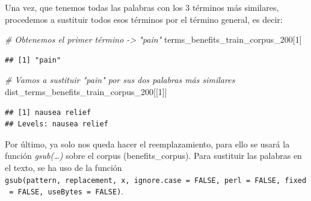 \documentclass[spanish,]{article}
\newenvironment{Shaded}{\begin{snugshade}}{\end{snugshade}}
\newcommand{\DecValTok}[1]{\textcolor[rgb]{0.00,0.00,0.81}{#1}}
\newcommand{\CommentTok}[1]{\textcolor[rgb]{0.56,0.35,0.01}{\textit{#1}}}
\newcommand{\NormalTok}[1]{#1}
\begin{document}
Una vez, que tenemos todas las palabras con los 3 términos más
similares, procedemos a sustituir todos esos términos por el término
general, es decir:

\begin{Shaded}
\begin{Highlighting}[]
\CommentTok{# Obtenemos el primer término -> "pain"}
\NormalTok{terms_benefits_train_corpus_}\DecValTok{200}\NormalTok{[}\DecValTok{1}\NormalTok{]}
\end{Highlighting}
\end{Shaded}

\begin{verbatim}
## [1] "pain"
\end{verbatim}

\begin{Shaded}
\begin{Highlighting}[]
\CommentTok{# Vamos a sustituir "pain" por sus dos palabras más similares}
\NormalTok{dist_terms_benefits_train_corpus_}\DecValTok{200}\NormalTok{[[}\DecValTok{1}\NormalTok{]]}
\end{Highlighting}
\end{Shaded}

\begin{verbatim}
## [1] nausea relief
## Levels: nausea relief
\end{verbatim}

Por último, ya solo nos queda hacer el reemplazamiento, para ello se
usará la función \emph{gsub(\ldots{})} sobre el corpus
(benefits\_corpus). Para sustituir las palabras en el texto, se ha uso
de la función
\texttt{gsub(pattern,\ replacement,\ x,\ ignore.case\ =\ FALSE,\ perl\ =\ FALSE,\ fixed\ =\ FALSE,\ useBytes\ =\ FALSE)}.
\end{document}
